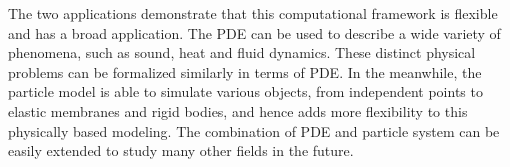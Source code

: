 The two applications demonstrate that this computational framework is flexible and has a broad application. The PDE can be used to describe a wide variety of phenomena, such as sound, heat and fluid dynamics. These distinct physical problems can be formalized similarly in terms of PDE. In the meanwhile, the particle model is able to simulate various objects, from independent points to elastic membranes and rigid bodies, and hence adds more flexibility to this physically based modeling. The combination of PDE and particle system can be easily extended to study many other fields in the future.